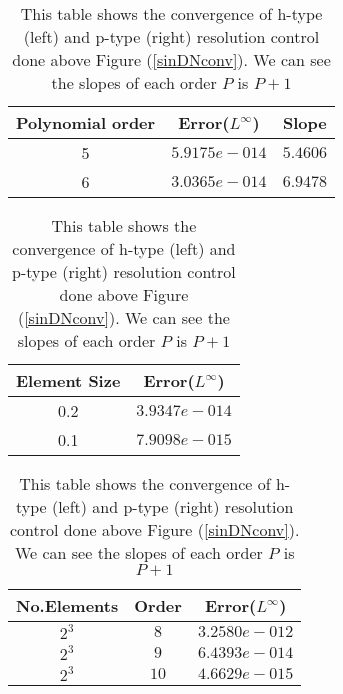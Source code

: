 \begin{table}[h]
\centering \caption{\label{hconv2t} This table shows the convergence of h-type (left) and p-type (right) resolution control done above Figure (\ref{sinDNconv}). We can see the slopes of each order $P$ is $P+1$ }
\begin{tabular}{|c|c|c|} \hline
    Polynomial order&Error($L^{\infty}$)&Slope   \\ \hline \hline
    5&$5.9175e-014$ &$5.4606$ \\ \hline
    6&$3.0365e-014$ &$6.9478$ \\ \hline
\end{tabular}
\begin{tabular}{|c|c|} \hline
    Element Size&Error($L^{\infty}$)  \\ \hline \hline
    0.2&$3.9347e-014$  \\ \hline
    0.1&$7.9098e-015$  \\ \hline
\end{tabular}

\begin{tabular}{|c|c|c|} \hline
    No.Elements&Order&Error($L^{\infty}$)  \\ \hline \hline
    $2^3$&$8$&$3.2580e-012$  \\ \hline
    $2^3$&$9$&$6.4393e-014$  \\ \hline
    $2^3$&$10$&$4.6629e-015$  \\ \hline
\end{tabular}
\end{table}
